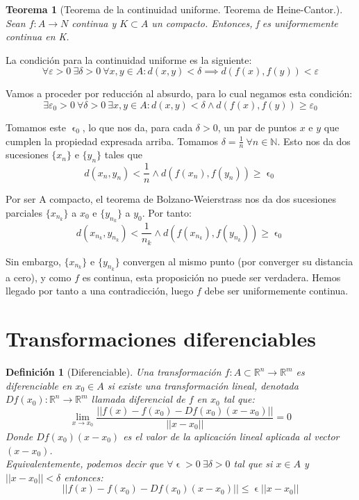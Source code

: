 \documentclass[11pt, a4paper]{article}
\makeatletter
\let\epsilon\upvarepsilon
\renewenvironment{proof}[1][\proofname] {\vspace{-15pt}\par\pushQED{\qed}\normalfont\topsep6\p@\@plus6\p@\relax\trivlist\item[\hskip\labelsep\it#1\@addpunct{.}]\ignorespaces}{\popQED\endtrivlist\@endpefalse}
\newcommand{\R}{\mathbb{R}}
\theoremstyle{theorem-style}
\newtheorem*{nth}{Teorema}
\theoremstyle{definition-style}
\newtheorem*{ndef}{Definición}
\theoremstyle{remark-style}
\theoremstyle{example-style}
\makeatother
\begin{document}
\begin{nth}[Teorema de la continuidad uniforme. Teorema de Heine-Cantor.]
	Sean $f:A \to N$ continua y $K\subset A $ un compacto. Entonces, f es uniformemente continua en K.
\end{nth}
\begin{proof}
		La condición para la continuidad uniforme es la siguiente:
	\[
		\forall \varepsilon > 0 \  \exists \delta > 0 \ \forall x, y \in A : d(x,y) < \delta \implies d (f(x) , f(y) ) < \varepsilon
	\]
	
	Vamos a proceder por reducción al absurdo, para lo cual negamos esta condición:
	\[
		\exists \varepsilon_0 > 0 \ \forall \delta > 0 \ \exists x, y \in A : d (x,y) < \delta \wedge d (f(x) , f(y) ) \ge \varepsilon_0
	\]
	
	Tomamos este $\epsilon_0$, lo que nos da, para cada $\delta>0$, un par de puntos $x$ e $y$ que cumplen la propiedad expresada arriba. Tomamos $\delta = \frac{1}{n} \ \forall n\in \mathbb{N}$. Esto nos da dos sucesiones $\{x_n\}$ e $\{y_n\}$ tales que
	\[
		d(x_n,y_n) < \frac{1}{n} \wedge d(f(x_n),f(y_n)) \ge \epsilon_0
	\]
	
	Por ser A compacto, el teorema de Bolzano-Weierstrass nos da dos sucesiones parciales $\{x_{n_k}\}$ a $x_0$ e $\{y_{n_k}\}$ a $y_0$. Por tanto:
	\[
		d(x_{n_k},y_{n_k}) < \frac{1}{n_k} \wedge d(f(x_{n_k}),f(y_{n_k})) \ge \epsilon_0
	\]
	
	Sin embargo, $\{x_{n_k}\}$ e $\{y_{n_k}\}$ convergen al mismo punto (por converger su distancia a cero), y como $f$ es continua, esta proposición no puede ser verdadera. Hemos llegado por tanto a una contradicción, luego $f$ debe ser uniformemente continua.
\end{proof}



\section{Transformaciones diferenciables}

\begin{ndef}
	[Diferenciable]
	Una transformación $f:A\subset \R^n \to \R^m$ es diferenciable en $x_0 \in A$ si existe una transformación lineal, denotada $Df(x_0): \R^n \to \R^m$ llamada diferencial de $f$ en $x_0$ tal que:
	 \[
	 \lim_{x\to x_0}\frac{||f(x)-f(x_0)-Df(x_0)(x-x_0)||}{||x-x_0||} = 0
	 \]
	 Donde $Df(x_0)(x-x_0)$ es el valor de la aplicación lineal aplicada al vector $(x-x_0)$.\\
	 
	Equivalentemente, podemos decir que $\forall \epsilon > 0 \ \exists \delta > 0$ tal que si $x\in A $ y $||x-x_0||< \delta$ entonces:
	\[
	||f(x)-f(x_0) - Df(x_0)(x-x_0) ||  \leq \epsilon ||x-x_0||
	\]
\end{ndef}
\end{document}
